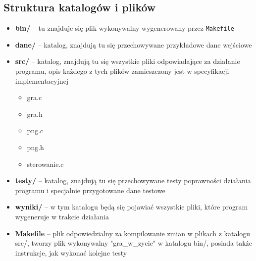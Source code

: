 \documentclass[12pt]{report}
\newcommand{\code}[1]{\texttt{#1}}
\begin{document}
\subsection{Struktura katalogów i plików}
\begin{itemize}
    \item \textbf{bin/} – tu znajduje się plik wykonywalny wygenerowany przez \code{Makefile}
    \item \textbf{dane/} – katalog, znajdują tu się przechowywane przykładowe dane wejściowe 
    \item \textbf{src/} – katalog, znajdują tu się wszystkie pliki odpowiadające za działanie programu, opis każdego z tych plików zamieszczony jest w specyfikacji implementacyjnej
    \begin{itemize}
        \item gra.c
        \item gra.h
        \item png.c
        \item png.h
        \item sterowanie.c
    \end{itemize}
    \item \textbf{testy/} – katalog, znajdują tu się przechowywane testy poprawności działania programu i specjalnie przygotowane dane testowe
    \item \textbf{wyniki/} – w tym katalogu będą się pojawiać wszystkie pliki, które program wygeneruje w trakcie działania
    \item \textbf{Makefile} – plik odpowiedzialny za kompilowanie zmian w plikach z katalogu src/, tworzy plik wykonywalny "gra\_w\_zycie" w katalogu bin/, posiada także instrukcje, jak wykonać kolejne testy
\end{itemize}
\end{document}
